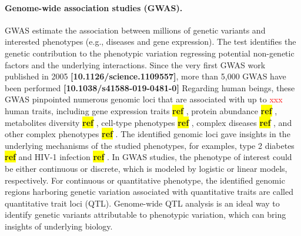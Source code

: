 \documentclass[12pt,usletter, fancy]{elegantbook}
\newcommand{\reqref}[1][ref]{
  \colorbox{yellow}{\textbf{#1}}
}
\begin{document}
\paragraph*{Genome-wide association studies (GWAS).}
GWAS estimate the association between millions of genetic variants and interested phenotypes (e.g., diseases and gene expression).
The test identifies the genetic contribution to the phenotypic variation regressing potential non-genetic factors and the underlying interactions.
Since the very first GWAS work published in 2005 \textbf{[10.1126/science.1109557]}, more than 5,000 GWAS have been performed \textbf{[10.1038/s41588-019-0481-0]}
Regarding human beings, these GWAS pinpointed numerous genomic loci that are associated with up to \textcolor{red}{xxx} human traits, including gene expression traits\reqref, protein abundance\reqref, metabolites diversity\reqref, cell-type phenotypes\reqref, complex diseases\reqref, and other complex phenotypes\reqref.
The identified genomic loci gave insights in the underlying mechanisms of the studied phenotypes, for examples, type 2 diabetes\reqref and HIV-1 infection\reqref.
In GWAS studies, the phenotype of interest could be either continuous or discrete, which is modeled by logistic or linear models, respectively.
For continuous or quantitative phenotype, the identified genomic regions harboring genetic variation associated with quantitative traits are called quantitative trait loci (QTL).
Genome-wide QTL analysis is an ideal way to identify genetic variants attributable to phenotypic variation, which can bring insights of underlying biology.
\end{document}
